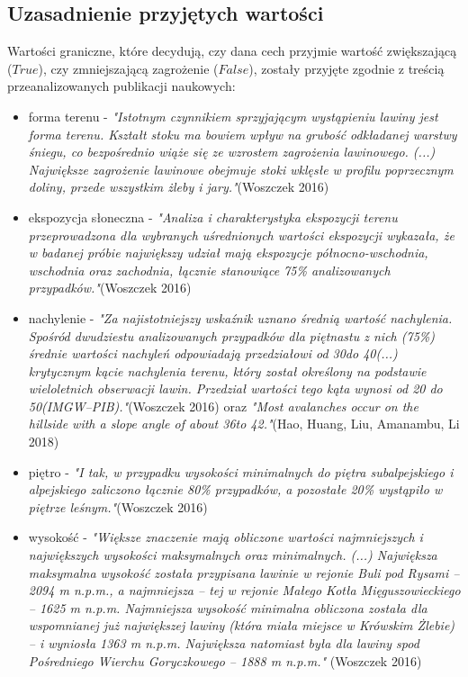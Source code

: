 \subsection{Uzasadnienie przyjętych wartości}
Wartości graniczne, które decydują, czy dana cech przyjmie wartość zwiększającą ($True$), czy zmniejszającą zagrożenie ($False$), zostały przyjęte zgodnie z treścią przeanalizowanych publikacji naukowych:
\begin{itemize}
	\item forma terenu - \textit{"Istotnym czynnikiem sprzyjającym wystąpieniu lawiny jest forma terenu. Kształt stoku ma bowiem wpływ na grubość odkładanej warstwy śniegu, co bezpośrednio wiąże się ze wzrostem zagrożenia lawinowego. (...) Największe zagrożenie lawinowe obejmuje stoki wklęsłe w profilu poprzecznym doliny, przede wszystkim żleby i jary."}\;(Woszczek 2016)
	\item ekspozycja słoneczna - \textit{"Analiza i charakterystyka ekspozycji terenu przeprowadzona dla wybranych uśrednionych wartości ekspozycji wykazała, że w badanej próbie największy udział mają ekspozycje północno-wschodnia, wschodnia oraz zachodnia, łącznie stanowiące 75\% analizowanych przypadków."}\;(Woszczek 2016)
	\item nachylenie - \textit{"Za najistotniejszy wskaźnik uznano średnią wartość nachylenia. Spośród dwudziestu analizowanych przypadków dla piętnastu z nich (75\%) średnie wartości nachyleń odpowiadają przedziałowi od 30\degree do 40\degree (...) krytycznym kącie nachylenia terenu, który został określony na podstawie wieloletnich obserwacji lawin. Przedział wartości tego kąta wynosi od 20 do 50\degree \;(IMGW–PIB)."}\;(Woszczek 2016) oraz \textit{"Most avalanches occur on the hillside with a slope angle of about 36\degree to 42\degree."}\;(Hao, Huang, Liu, Amanambu, Li 2018)
	\item piętro - \textit{"I tak, w przypadku wysokości minimalnych do piętra subalpejskiego i alpejskiego zaliczono łącznie 80\% przypadków, a pozostałe 20\% wystąpiło w piętrze leśnym."}\;(Woszczek 2016)
	\item wysokość - \textit{"Większe znaczenie mają obliczone wartości najmniejszych i największych wysokości maksymalnych oraz minimalnych. (...) Największa maksymalna wysokość została przypisana lawinie w rejonie Buli pod Rysami – 2094 m n.p.m., a najmniejsza – tej w rejonie Małego Kotła
	Mięguszowieckiego – 1625 m n.p.m. Najmniejsza wysokość minimalna obliczona została dla wspomnianej już największej lawiny (która miała miejsce w Krówskim Żlebie) – i wyniosła 1363 m n.p.m. Największa natomiast była dla lawiny spod Pośredniego Wierchu Goryczkowego – 1888 m n.p.m."} (Woszczek 2016)

\end{itemize}
